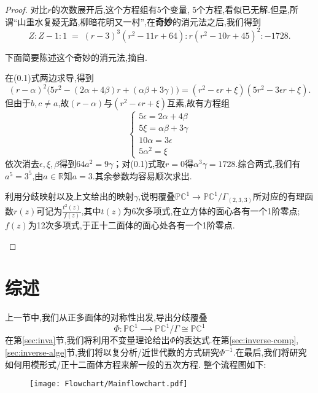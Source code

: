 \begin{proof}
	对比$r$的次数展开后,这个方程组有$5$个变量, $5$个方程,看似已无解.但是,所谓“山重水复疑无路,柳暗花明又一村”,在\textbf{奇妙}的消元法之后,我们得到
	\[Z:Z-1:1\;=\;(r-3)^3(r^2-11r+64):r(r^2-10r+45)^2:-1728.\]
	
	下面简要陈述这个奇妙的消元法,摘自\cite[P111]{klein2003lectures}.
	
	在(0.1)式两边求导,得到
	$$(r-\alpha)^2\big(5r^2-(2\alpha+4\beta)r+(\alpha\beta+3\gamma)\big)=(r^2-\epsilon r+\xi)(5r^2-3\epsilon r+\xi). $$
	但由于$b,c\neq a$,故$(r-\alpha)$与$(r^2-\epsilon r+\xi)$互素,故有方程组
	$$\begin{cases}5\epsilon=2\alpha+4\beta\\5\xi=\alpha\beta+3\gamma\\10\alpha=3\epsilon\\5\alpha^2=\xi\end{cases}$$
	依次消去$\epsilon,\xi,\beta$得到$64a^2=9\gamma$；对(0.1)式取$r=0$得$\alpha^3\gamma=1728$.综合两式,我们有$a^5=3^5$,由$a\in\mathbb{R}$知$a=3$.其余参数均容易顺次求出.
	\begin{exercise}\label{exercise:function}
		利用分歧映射以及上文给出的映射$\gamma$,说明覆叠$\mathbb{P}\mathbb{C}^1 \longrightarrow \mathbb{P}\mathbb{C}^1/\Gamma_{(2,3,3)}$所对应的有理函数$r(z)$可记为$\frac{t^2(z)}{f(z)}$,其中$t(z)$为6次多项式,在立方体的面心各有一个1阶零点; $f(z)$为12次多项式,于正十二面体的面心处各有一个1阶零点.
	\end{exercise}
	
\end{proof}
\section{综述}
上一节中,我们从正多面体的对称性出发,导出分歧覆叠
$$\varPhi\colon \mathbb{PC}^1 \xrightarrow{\qquad} \mathbb{PC}^1/\Gamma \cong \mathbb{PC}^1$$
在第\ref{sec:inva}节,我们将利用不变量理论给出$\Phi$的表达式.在第\ref{sec:inverse-comp},\ref{sec:inverse-alge}节,我们将以复分析/近世代数的方式研究$\Phi^{-1}$.在最后,我们将研究如何用模形式/正十二面体方程来解一般的五次方程. 整个流程图如下:
\begin{figure}[ht]
	
	\begin{minipage}[t]{.9\textwidth}
		\vspace{0.1cm}
		\centering
		\texttt{[image: Flowchart/Mainflowchart.pdf]}
		
	\end{minipage}
	\label{pic:flow}
\end{figure}
